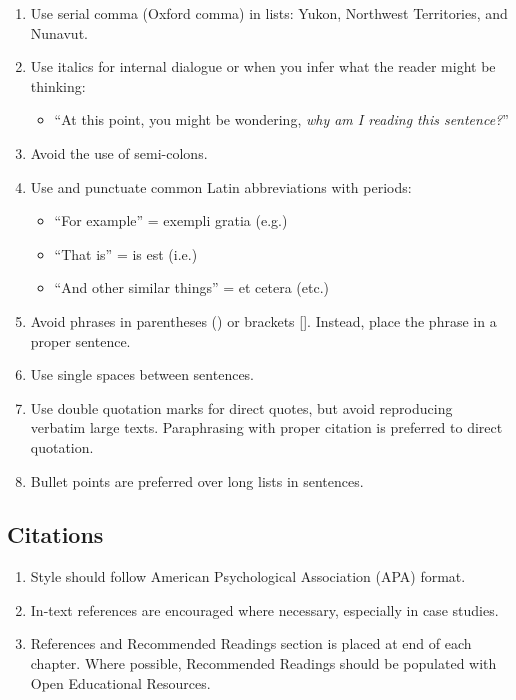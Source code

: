 \documentclass[
]{book}
\providecommand{\tightlist}{%
  \setlength{\itemsep}{0pt}\setlength{\parskip}{0pt}}
\begin{document}
\begin{enumerate}
\def\labelenumi{\arabic{enumi}.}
\tightlist
\item
  Use serial comma (Oxford comma) in lists: Yukon, Northwest Territories, and Nunavut.
\item
  Use italics for internal dialogue or when you infer what the reader might be thinking:

  \begin{itemize}
  \tightlist
  \item
    ``At this point, you might be wondering, \emph{why am I reading this sentence?}''
  \end{itemize}
\item
  Avoid the use of semi-colons.
\item
  Use and punctuate common Latin abbreviations with periods:

  \begin{itemize}
  \tightlist
  \item
    ``For example'' = exempli gratia (e.g.)
  \item
    ``That is'' = is est (i.e.)
  \item
    ``And other similar things'' = et cetera (etc.)
  \end{itemize}
\item
  Avoid phrases in parentheses () or brackets {[}{]}. Instead, place the phrase in a proper sentence.
\item
  Use single spaces between sentences.
\item
  Use double quotation marks for direct quotes, but avoid reproducing verbatim large texts. Paraphrasing with proper citation is preferred to direct quotation.
\item
  Bullet points are preferred over long lists in sentences.
\end{enumerate}

\hypertarget{citations}{%
\subsection{Citations}\label{citations}}

\begin{enumerate}
\def\labelenumi{\arabic{enumi}.}
\tightlist
\item
  Style should follow American Psychological Association (APA) format.
\item
  In-text references are encouraged where necessary, especially in case studies.
\item
  References and Recommended Readings section is placed at end of each chapter. Where possible, Recommended Readings should be populated with Open Educational Resources.
\end{enumerate}
\end{document}
